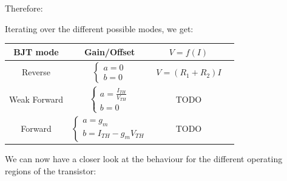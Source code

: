 \documentclass[10pt]{article}
\begin{document}
Therefore:

\centerline{}

Iterating over the different possible modes, we get:

\begin{table}[h]
	\centering
	\begin{tabular}{|c||c|c|c|}
		\hline
		\textbf{BJT mode} & \textbf{Gain/Offset} & $V = f(I)$ \\ \hline

		Reverse 
		& 
		$\left\{
		\begin{array}{ll}
			a = 0 \\
			b = 0
		\end{array}
		\right.$
		& 
		$V = (R_1 + R_2)I$	\\ \hline

		Weak Forward
		& 
		$\left\{
		\begin{array}{ll}
			a = \frac{I_{TH}}{V_{TH}} \\
			b = 0
		\end{array}
		\right.$
		& 
		TODO 	\\ \hline

		Forward
		& 
		$\left\{
		\begin{array}{ll}
			a = g_m \\
			b = I_{TH}-g_m V_{TH}
		\end{array}
		\right.$ 
		&
		TODO 	\\ \hline
	\end{tabular}
\end{table}


We can now have a closer look at the behaviour for the different operating regions of the transistor:
\end{document}
